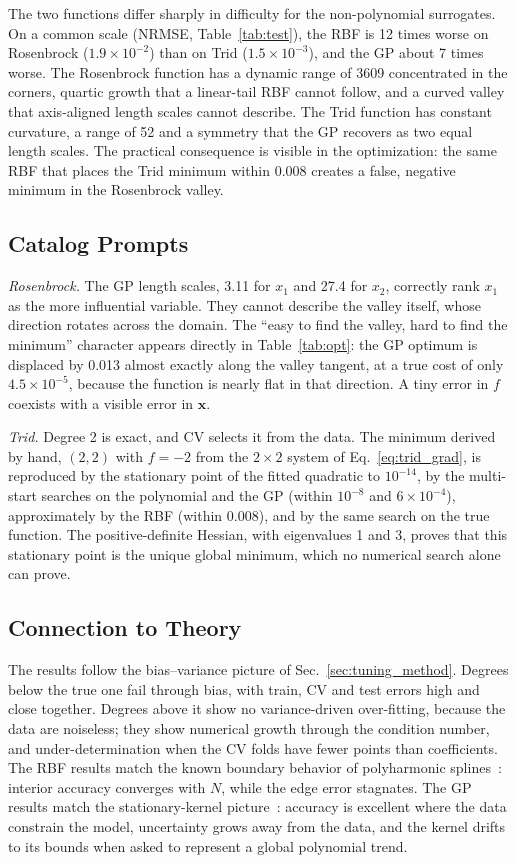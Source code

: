 The two functions differ sharply in difficulty for the non-polynomial surrogates. On a common scale (NRMSE, Table~\ref{tab:test}), the RBF is 12 times worse on Rosenbrock ($1.9\times10^{-2}$) than on Trid ($1.5\times10^{-3}$), and the GP about 7 times worse. The Rosenbrock function has a dynamic range of 3609 concentrated in the corners, quartic growth that a linear-tail RBF cannot follow, and a curved valley that axis-aligned length scales cannot describe. The Trid function has constant curvature, a range of 52 and a symmetry that the GP recovers as two equal length scales. The practical consequence is visible in the optimization: the same RBF that places the Trid minimum within 0.008 creates a false, negative minimum in the Rosenbrock valley.

\subsection{Catalog Prompts}

\emph{Rosenbrock.} The GP length scales, 3.11 for $x_1$ and 27.4 for $x_2$, correctly rank $x_1$ as the more influential variable. They cannot describe the valley itself, whose direction rotates across the domain. The ``easy to find the valley, hard to find the minimum'' character appears directly in Table~\ref{tab:opt}: the GP optimum is displaced by 0.013 almost exactly along the valley tangent, at a true cost of only $4.5\times10^{-5}$, because the function is nearly flat in that direction. A tiny error in $f$ coexists with a visible error in $\mathbf{x}$.

\emph{Trid.} Degree 2 is exact, and CV selects it from the data. The minimum derived by hand, $(2,2)$ with $f=-2$ from the $2\times2$ system of Eq.~\eqref{eq:trid_grad}, is reproduced by the stationary point of the fitted quadratic to $10^{-14}$, by the multi-start searches on the polynomial and the GP (within $10^{-8}$ and $6\times10^{-4}$), approximately by the RBF (within 0.008), and by the same search on the true function. The positive-definite Hessian, with eigenvalues 1 and 3, proves that this stationary point is the unique global minimum, which no numerical search alone can prove.

\subsection{Connection to Theory}

The results follow the bias--variance picture of Sec.~\ref{sec:tuning_method}. Degrees below the true one fail through bias, with train, CV and test errors high and close together. Degrees above it show no variance-driven over-fitting, because the data are noiseless; they show numerical growth through the condition number, and under-determination when the CV folds have fewer points than coefficients. The RBF results match the known boundary behavior of polyharmonic splines~\cite{fornberg2002}: interior accuracy converges with $N$, while the edge error stagnates. The GP results match the stationary-kernel picture~\cite{rasmussen2006}: accuracy is excellent where the data constrain the model, uncertainty grows away from the data, and the kernel drifts to its bounds when asked to represent a global polynomial trend.

